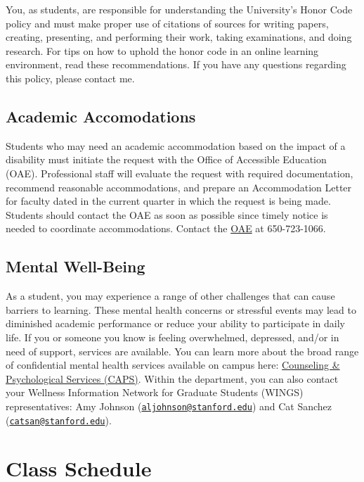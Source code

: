\documentclass[11pt,]{article}
\begin{document}
You, as students, are responsible for understanding the University's
Honor Code policy and must make proper use of citations of sources for
writing papers, creating, presenting, and performing their work, taking
examinations, and doing research. For tips on how to uphold the honor
code in an online learning environment, read these recommendations. If
you have any questions regarding this policy, please contact me.

\hypertarget{academic-accomodations}{%
\subsection{Academic Accomodations}\label{academic-accomodations}}

Students who may need an academic accommodation based on the impact of a
disability must initiate the request with the Office of Accessible
Education (OAE). Professional staff will evaluate the request with
required documentation, recommend reasonable accommodations, and prepare
an Accommodation Letter for faculty dated in the current quarter in
which the request is being made. Students should contact the OAE as soon
as possible since timely notice is needed to coordinate accommodations.
Contact the \href{http://oae.stanford.edu}{OAE} at 650-723-1066.

\hypertarget{mental-well-being}{%
\subsection{Mental Well-Being}\label{mental-well-being}}

As a student, you may experience a range of other challenges that can
cause barriers to learning. These mental health concerns or stressful
events may lead to diminished academic performance or reduce your
ability to participate in daily life. If you or someone you know is
feeling overwhelmed, depressed, and/or in need of support, services are
available. You can learn more about the broad range of confidential
mental health services available on campus here:
\href{https://caps.stanford.edu/}{Counseling \& Psychological Services
(CAPS)}. Within the department, you can also contact your Wellness
Information Network for Graduate Students (WINGS) representatives: Amy
Johnson
(\href{mailto:aljohnson@stanford.edu}{\nolinkurl{aljohnson@stanford.edu}})
and Cat Sanchez
(\href{mailto:catsan@stanford.edu}{\nolinkurl{catsan@stanford.edu}}).

\hypertarget{class-schedule}{%
\section{Class Schedule}\label{class-schedule}}
\end{document}
